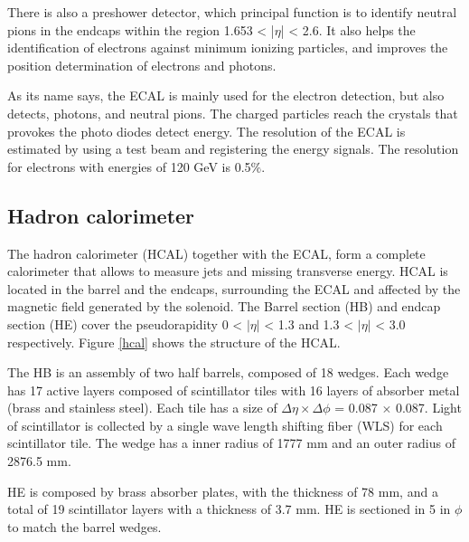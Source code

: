 There is also a preshower detector, which principal function is to identify neutral pions in the
endcaps within the region 1.653 < |$\eta$| < 2.6. It also helps the identification of electrons
against minimum ionizing particles, and improves the position determination of electrons and photons.


As its name says, the ECAL is mainly used for the electron detection, but also detects, photons, and neutral pions. The charged particles reach the crystals that provokes the photo diodes detect energy.
The resolution of the ECAL is estimated by using a test beam and registering the energy signals. The resolution for electrons with energies of 120 GeV is 0.5$\%$.
 


\subsection{Hadron calorimeter}
The hadron calorimeter (HCAL) together with the ECAL, form a complete calorimeter that allows to measure jets and missing transverse energy. HCAL is located in the barrel and the endcaps, surrounding the ECAL and affected by the magnetic field generated by the solenoid. The Barrel section (HB) and endcap section (HE) cover the pseudorapidity 0 < $|\eta|$ < 1.3 and 1.3 < $|\eta|$ < 3.0 respectively. Figure \ref{hcal} shows the structure of the HCAL.

The HB is an assembly of two half barrels, composed of 18 wedges. Each wedge has 17 active layers composed of scintillator tiles with 16 layers of absorber metal (brass and stainless steel). Each tile has a size of $\Delta \eta \times \Delta \phi$ = 0.087 $\times$ 0.087. Light of scintillator is collected by a single wave
length shifting fiber (WLS) for each scintillator tile. The wedge has a inner radius of 1777 mm and an outer radius of 2876.5 mm. 

HE is composed by brass absorber plates, with the thickness of 78 mm, and a total of 19 scintillator layers with a thickness of 3.7 mm. HE is sectioned in 5 in $\phi$ to match the barrel wedges.

